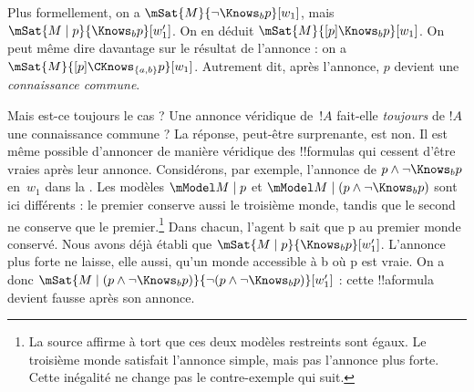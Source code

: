 \documentclass[../../../include/open-logic-section]{subfiles}
\begin{document}
Plus formellement, on a $\mSat{M}{\lnot \Knows_b p}[w_1]$, mais
$\mSat{M
\mid p}{\Knows_b p}[w'_1]$. On en déduit
$\mSat{M}{[p] \Knows_b
p}[w_1]$. On peut même dire davantage sur le résultat de l'annonce :
on a $\mSat{M}{[p]\CKnows_{\{a,b\}} p}[w_1]$. Autrement dit,
après l'annonce, $p$ devient une \emph{connaissance commune}.

Mais est-ce toujours le cas ? Une annonce véridique de~$!A$
fait-elle \emph{toujours} de $!A$ une connaissance commune ? La
réponse, peut-être surprenante, est non. Il est même possible
d'annoncer de manière véridique des !!{formula}s qui cessent
d'être vraies après leur annonce. Considérons, par exemple,
l'annonce de $p \land \lnot \Knows_b p$ en~$w_1$ dans la
. Les modèles $\mModel M \mid p$ et
$\mModel M \mid (p \land \lnot \Knows_b p)$ sont ici différents :
le premier conserve aussi le troisième monde, tandis que le second
ne conserve que le premier.\footnote{La source affirme à tort que ces deux modèles restreints sont égaux. Le troisième monde satisfait l'annonce simple, mais pas l'annonce plus forte. Cette inégalité ne change pas le contre-exemple qui suit.} Dans chacun, l'agent b sait que p au
premier monde conservé. Nous avons déjà établi que
$\mSat{M \mid p}{\Knows_b
p}[w'_1]$. L'annonce plus forte ne laisse, elle aussi, qu'un monde
accessible à b où p est vraie. On a donc
$\mSat{M \mid (p \land \lnot \Knows_b p)}{\lnot
(p \land \lnot \Knows_b p)}[w'_1]$ : cette !!a{formula} devient
fausse après son annonce.
\end{document}
